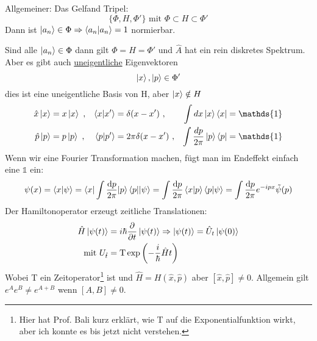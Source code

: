 		Allgemeiner: Das Gelfand Tripel:
			\begin{equation*}
				\{\Phi, H, \Phi'\} \text{~mit~} \Phi \subset H \subset \Phi'
			\end{equation*}
		Dann ist $\ket{a_n} \in \Phi \Rightarrow \braket{a_n | a_n} = 1$ normierbar.
		
		Sind alle $\ket{a_n} \in \Phi$ dann gilt $\Phi = H = \Phi'$ und $\hat{A}$ hat ein rein diskretes Spektrum.
		Aber es gibt auch \underline{uneigentliche} Eigenvektoren
			\begin{equation*}
				\ket{x}, \ket{p} \in \Phi'
			\end{equation*}
		dies ist eine uneigentliche Basis von H, aber $\ket{x} \notin H$
			\begin{align*}
				\hat{x} \ket{x} &= x \ket{x} ~,& \braket{ x | x'} &= \delta(x-x') ~,& \int dx \ket{x} \bra{x} &= \mathds{1} \\		
				\hat{p} \ket{p} &= p \ket{p} ~,& \braket{ p|p'} &= 2\pi \delta (x-x') ~,& \int \frac{dp}{2\pi} \ket{p} \bra{p} &= \mathds{1}
			\end{align*}		
		Wenn wir eine Fourier Transformation machen, fügt man im Endeffekt einfach eine $\mathds{1}$ ein:
			\begin{align*}
				\psi(x) =
				\braket{ x|\psi } = \braket{x | \int \frac{\mathrm{d} p}{2\pi} | p} \braket{p | |\psi} =
				\int \frac{\mathrm{d} p}{2\pi} \braket{x|p} \braket{p|\psi} = 
				\int \frac{\mathrm{d} p}{2\pi} e^{-ipx} \tilde{\psi}(p)
			\end{align*}
		Der Hamiltonoperator erzeugt zeitliche Translationen:
			\begin{align*}
				\hat{H} \ket{\psi(t)} &= i\hbar \frac{\partial}{\partial t} \ket{\psi(t)}
				\Rightarrow \ket{\psi(t)} = \hat{U}_t \ket{\psi(0)} \\
				\text{mit~} U_{\hat{t}} &= \text{T} \exp \left( -\frac{i}{\hbar} \hat{H} t \right)
			\end{align*}
		Wobei T ein Zeitoperator\footnote{Hier hat Prof. Bali kurz erklärt, wie T auf die Exponentialfunktion wirkt, aber ich konnte es bis jetzt nicht verstehen.} ist und $\hat{H}=H(\hat{x}, \hat{p})$ aber $[\hat{x}, \hat{p}] \neq 0$. 
		Allgemein gilt $e^A e^B \neq e^{A+B}$ wenn $[A,B] \neq 0$.
		
